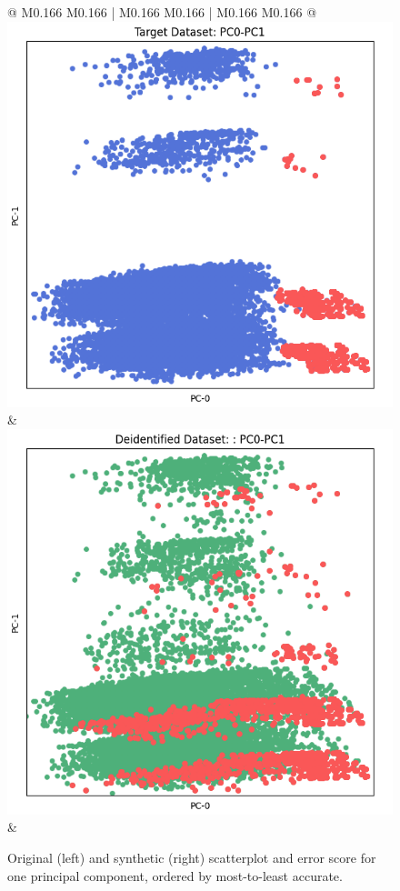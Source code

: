 \begin{figure}[p!]
\begin{tabular}{@{} M{0.166\textwidth} M{0.166\textwidth} | M{0.166\textwidth} M{0.166\textwidth} | M{0.166\textwidth} M{0.166\textwidth} @{}}
       \includegraphics[width=\linewidth]{z_PRAM.orig.png} &
       \includegraphics[width=\linewidth]{z_PRAM.syn.png} \\ 
 &
 \\ 
    \end{tabular}
\caption{Original (left) and synthetic (right) scatterplot and error score for one principal component, ordered by most-to-least accurate.}
\label{fig:pca_grid}
\end{figure}